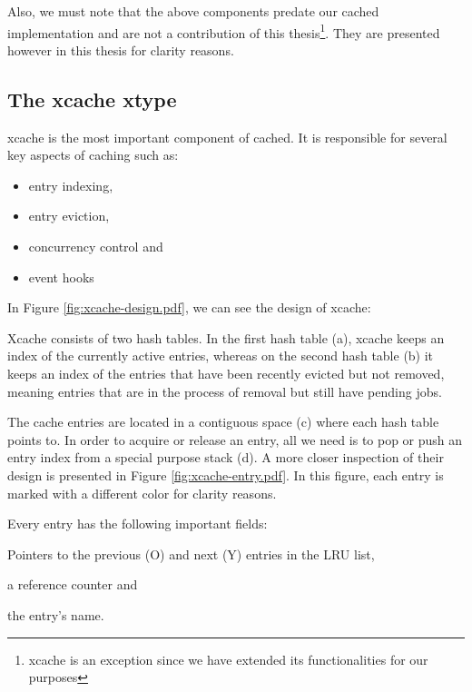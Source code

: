 Also, we must note that the above components predate our cached implementation 
and are not a contribution of this thesis\footnote{xcache is an exception since 
	we have extended its functionalities for our purposes}. They are 
presented however in this thesis for clarity reasons. 

\subsection{The xcache xtype}\label{sec:xcache-design}

xcache is the most important component of cached. It is responsible for several 
key aspects of caching such as:

\begin{itemize}
	\item entry indexing,
	\item entry eviction,
	\item concurrency control and
	\item event hooks
\end{itemize}

In Figure \ref{fig:xcache-design.pdf}, we can see the design of xcache:


Xcache consists of two hash tables. In the first hash table (a), xcache keeps 
an index of the currently active entries, whereas on the second hash table (b) 
it keeps an index of the entries that have been recently evicted but not 
removed, meaning entries that are in the process of removal but still have 
pending jobs.

The cache entries are located in a contiguous space (c) where each hash table 
points to. In order to acquire or release an entry, all we need is to pop or 
push an entry index from a special purpose stack (d). A more closer inspection 
of their design is presented in Figure \ref{fig:xcache-entry.pdf}. In this 
figure, each entry is marked with a different color for clarity reasons.


Every entry has the following important fields:
\begin{inparaenum}[(i)]
	\item Pointers to the previous (O) and next (Y) entries in the LRU 
		list,
	\item a reference counter and
	\item the entry's name.
\end{inparaenum}


